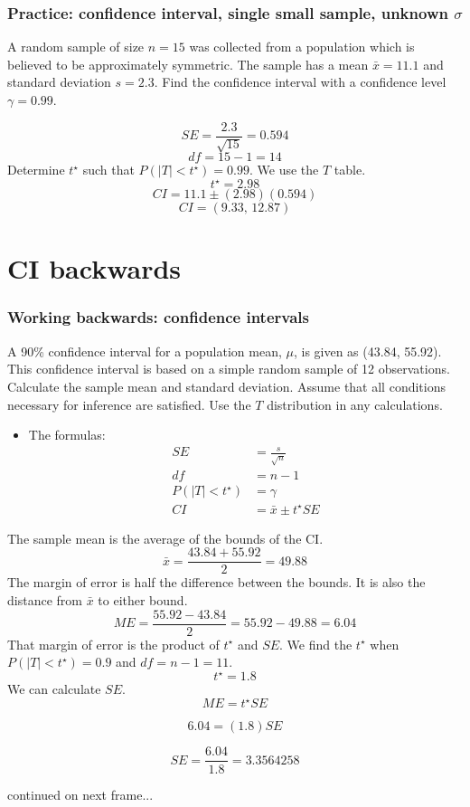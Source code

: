 \documentclass[slidestop,compress,mathserif]{beamer}
\newcommand{\solnGr}[1]{#1}
\begin{document}
\begin{frame}
\frametitle{Practice: confidence interval, single small sample, unknown $\sigma$}
A random sample of size $n=15$ was collected from a population which is believed to be approximately symmetric. The sample has a mean $\bar{x}=11.1$ and standard deviation $s=2.3$. Find the confidence interval with a confidence level $\gamma = 0.99$.
\pause
\solnGr{
$$SE = \frac{2.3}{\sqrt{15}} = 0.594 $$
\pause
$$df = 15-1 = 14 $$
\pause
Determine $t^\star$ such that $P(|T|<t^{\star}) = 0.99$. We use the $T$ table.
\pause
$$t^{\star} = 2.98 $$
\pause
$$CI = 11.1 \pm (2.98)(0.594) $$
\pause
$$CI = (9.33,\,12.87) $$
}
\end{frame}

\section{CI backwards}

\begin{frame}
\frametitle{Working backwards: confidence intervals}
A 90\% confidence interval for a population mean, \(\mu\), is given as
(43.84, 55.92). This confidence interval is based on a simple random
sample of 12 observations. Calculate the sample mean and standard
deviation. Assume that all conditions necessary for inference are
satisfied. Use the \(T\) distribution in any calculations.
\pause
\begin{itemize}
\item The formulas:
\begin{align*}
SE &= \frac{s}{\sqrt{n}} \\
df &= n-1\\
P(|T|<t^{\star}) &= \gamma\\ 
CI &= \bar{x} \pm t^{\star} SE 
\end{align*}
\end{itemize}
\end{frame}


\begin{frame}
The sample mean is the average of the bounds of the CI. \pause
\[\bar{x} = \frac{43.84 + 55.92}{2} = 49.88 \] \pause
The margin of error is half the difference between the bounds. It is also the distance from \(\bar{x}\) to either bound. \pause
\[ME = \frac{55.92-43.84}{2} = 55.92-49.88  = 6.04\] \pause
That margin of error is the product of \(t^{\star}\) and \(SE\). \pause We find the \(t^{\star}\) when \(P(|T|<t^{\star})=0.9\) and \(df=n-1=11\). \pause
\[t^{\star} = 1.8 \] 
\pause
We can calculate \(SE\).
\pause
 \[ME = t^{\star} SE \]
 
\pause
\[6.04 = (1.8) SE \]

\pause
\[SE = \frac{6.04}{1.8} = 3.3564258 \]

continued on next frame...
\end{frame}
\end{document}

